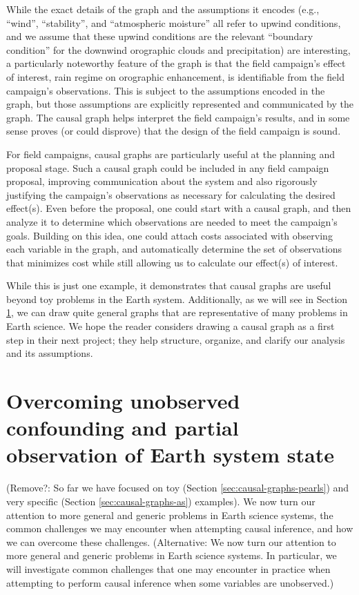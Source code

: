 \documentclass[12pt]{article}
\begin{document}
While the exact details of the graph and the assumptions it encodes
(e.g., ``wind'', ``stability'', and ``atmospheric moisture'' all refer
to upwind conditions, and we assume that these upwind conditions are
the relevant ``boundary condition'' for the downwind orographic clouds
and precipitation) are interesting, a particularly noteworthy feature
of the graph is that the field campaign's effect of interest, rain
regime on orographic enhancement, is identifiable from the field
campaign's observations. This is subject to the assumptions encoded in
the graph, but those assumptions are explicitly represented and
communicated by the graph. The causal graph helps interpret the field
campaign's results, and in some sense proves (or could disprove) that
the design of the field campaign is sound.

For field campaigns, causal graphs are particularly useful at the
planning and proposal stage. Such a causal graph could be included in
any field campaign proposal, improving communication about the system
and also rigorously justifying the campaign’s observations as
necessary for calculating the desired effect(s). Even before the
proposal, one could start with a causal graph, and then analyze it to
determine which observations are needed to meet the campaign’s
goals. Building on this idea, one could attach costs associated with
observing each variable in the graph, and automatically determine the
set of observations that minimizes cost while still allowing us to
calculate our effect(s) of interest.

While this is just one example, it demonstrates that causal graphs are
useful beyond toy problems in the Earth system. Additionally, as we
will see in Section \ref{sec:necess-cond-caus}, we can draw quite
general graphs that are representative of many problems in Earth
science. We hope the reader considers drawing a causal graph as a
first step in their next project; they help structure, organize, and
clarify our analysis and its assumptions.


\section{Overcoming unobserved confounding and partial observation of Earth system state}
\label{sec:necess-cond-caus}

(Remove?: So far we have focused on toy (Section
\ref{sec:causal-graphs-pearls}) and very specific (Section
\ref{sec:causal-graphs-as}) examples). We now turn our attention to
more general and generic problems in Earth science systems, the common
challenges we may encounter when attempting causal inference, and how
we can overcome these challenges. (Alternative: We now turn our
attention to more general and generic problems in Earth science
systems. In particular, we will investigate common challenges that one
may encounter in practice when attempting to perform causal inference
when some variables are unobserved.)
\end{document}
